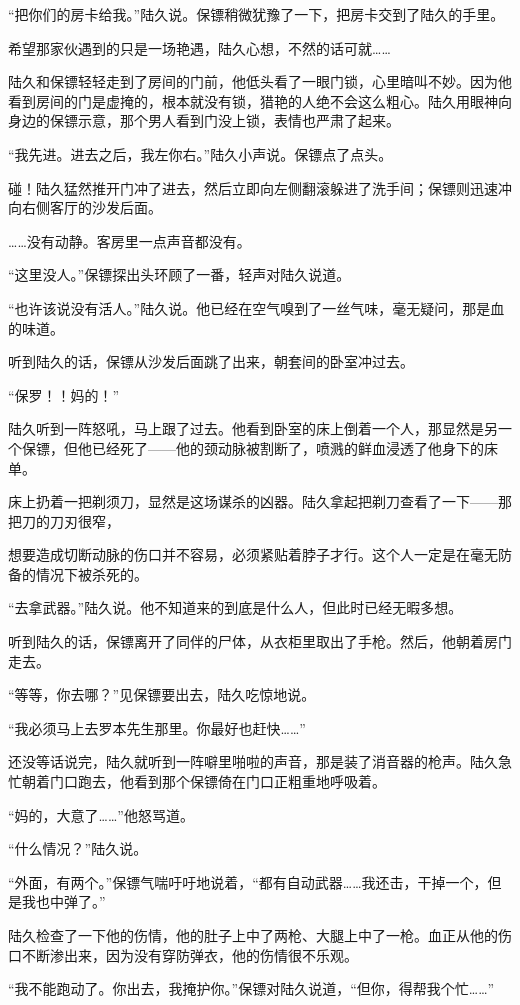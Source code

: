 “把你们的房卡给我。”陆久说。保镖稍微犹豫了一下，把房卡交到了陆久的手里。

希望那家伙遇到的只是一场艳遇，陆久心想，不然的话可就……

陆久和保镖轻轻走到了房间的门前，他低头看了一眼门锁，心里暗叫不妙。因为他看到房间的门是虚掩的，根本就没有锁，猎艳的人绝不会这么粗心。陆久用眼神向身边的保镖示意，那个男人看到门没上锁，表情也严肃了起来。

“我先进。进去之后，我左你右。”陆久小声说。保镖点了点头。

碰！陆久猛然推开门冲了进去，然后立即向左侧翻滚躲进了洗手间；保镖则迅速冲向右侧客厅的沙发后面。

……没有动静。客房里一点声音都没有。

“这里没人。”保镖探出头环顾了一番，轻声对陆久说道。

“也许该说没有活人。”陆久说。他已经在空气嗅到了一丝气味，毫无疑问，那是血的味道。

听到陆久的话，保镖从沙发后面跳了出来，朝套间的卧室冲过去。

“保罗！！妈的！”

陆久听到一阵怒吼，马上跟了过去。他看到卧室的床上倒着一个人，那显然是另一个保镖，但他已经死了——他的颈动脉被割断了，喷溅的鲜血浸透了他身下的床单。

床上扔着一把剃须刀，显然是这场谋杀的凶器。陆久拿起把剃刀查看了一下——那把刀的刀刃很窄，

想要造成切断动脉的伤口并不容易，必须紧贴着脖子才行。这个人一定是在毫无防备的情况下被杀死的。

“去拿武器。”陆久说。他不知道来的到底是什么人，但此时已经无暇多想。

听到陆久的话，保镖离开了同伴的尸体，从衣柜里取出了手枪。然后，他朝着房门走去。

“等等，你去哪？”见保镖要出去，陆久吃惊地说。

“我必须马上去罗本先生那里。你最好也赶快……”

还没等话说完，陆久就听到一阵噼里啪啦的声音，那是装了消音器的枪声。陆久急忙朝着门口跑去，他看到那个保镖倚在门口正粗重地呼吸着。

“妈的，大意了……”他怒骂道。

“什么情况？”陆久说。

“外面，有两个。”保镖气喘吁吁地说着，“都有自动武器……我还击，干掉一个，但是我也中弹了。”

陆久检查了一下他的伤情，他的肚子上中了两枪、大腿上中了一枪。血正从他的伤口不断渗出来，因为没有穿防弹衣，他的伤情很不乐观。

“我不能跑动了。你出去，我掩护你。”保镖对陆久说道，“但你，得帮我个忙……”

